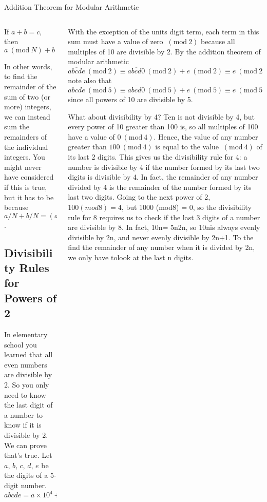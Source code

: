 \documentclass[9pt,aspectratio=169]{beamer}
\newcommand{\Mod}[1]{\ (\mathrm{mod}\ #1)}
\begin{document}
\begin{frame}{Addition Theorem for Modular Arithmetic}  
  \begin{columns}[T]
    \begin{column}{0.5\textwidth}
      \begin{theorem}
        If $a + b = c$, then \[a\Mod{N} + b\Mod{N} \equiv c\Mod{N}.\]
      \end{theorem}
      
      In other words, to find the remainder of the sum of two (or more) integers, we can instead sum the remainders of the individual integers.  You might never have considered if this is true, but it has to be because $a/N + b/N = (a + b)/N$.
      
      \subsection{Divisibility Rules for Powers of 2}

      In elementary school you learned that all even numbers are divisible by 2.  So you only need to know the last digit of a number to know if it is divisible by 2.  We can prove that’s true.  Let $a$, $b$, $c$, $d$, $e$ be the digits of a 5-digit number.
      \[
        \overline{abcde} = a \times 10^4 + b \times 10^3 + c \times 10^2+ d \times 10^1+ e \times 10^0.
      \]
      
    \end{column}
    \begin{column}{0.5\textwidth}
      With the exception of the units digit term, each term in this sum must have a value of zero $\Mod{2}$ because all multiples of 10 are divisible by 2. By the addition theorem of modular arithmetic
      \[
        \overline{abcde}\Mod{2} \equiv \overline{abcd0}\Mod{2} + e\Mod{2} \equiv e\Mod{2} 
      \]
      note also that
      \[
        \overline{abcde}\Mod{5} \equiv \overline{abcd0}\Mod{5} + e\Mod{5} \equiv e\Mod{5}  
      \]  
      since all powers of 10 are divisible by 5.
      
      What about divisibility by 4?  Ten is not divisible by 4, but every power of 10 greater than 100 is, so all multiples of 100 have a value of $0\Mod{4}$.  Hence, the value of any number greater than $100\Mod{4}$ is equal to the value $\Mod{4}$ of its last 2 digits.  This gives us the divisibility rule for 4: a number is divisible by 4 if the number formed by its last two digits is divisible by 4. In fact, the remainder of any number divided by 4 is the remainder of the number formed by its last two digits.  Going to the next power of 2, $100 (mod8) = 4$, but 1000 (mod8) = 0, so the divisibility rule for 8 requires us to check if the last 3 digits of a number are divisible by 8.  In fact, 10n= 5n2n, so 10nis always evenly divisible by 2n, and never evenly divisible by 2n+1.  To the find the remainder of any number when it is divided by 2n, we only have tolook at the last n digits.
    \end{column}
  \end{columns}
\end{frame}
\end{document}
